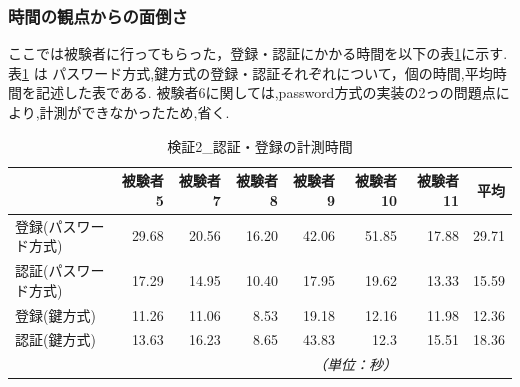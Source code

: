     \subsubsection{時間の観点からの面倒さ}
        ここでは被験者に行ってもらった，登録・認証にかかる時間を以下の表\ref{検証２ 認証・登録の計測時間}に示す.
        表\ref{検証２ 認証・登録の計測時間} は パスワード方式,鍵方式の登録・認証それぞれについて，個の時間,平均時間を記述した表である.
        被験者6に関しては,password方式の実装の2っの問題点により,計測ができなかったため,省く.
        \begin{table}[htb]
            \caption{検証2\_認証・登録の計測時間}
            \label{検証２ 認証・登録の計測時間}
            \begin{tabular}{|l|r|r|r|r|r|r|r|} \hline%
                                    & 被験者5 & 被験者7 & 被験者8 & 被験者9 & 被験者10 & 被験者11 & 平均 \\ \hline%
                登録(パスワード方式) & 29.68 & 20.56   & 16.20 & 42.06   & 51.85   & 17.88   & 29.71\\ \hline
                認証(パスワード方式) & 17.29 & 14.95   & 10.40 & 17.95   & 19.62   & 13.33   & 15.59\\ \hline
                登録(鍵方式)        & 11.26 & 11.06   & 8.53  & 19.18   & 12.16   & 11.98   & 12.36\\ \hline
                認証(鍵方式)        & 13.63 & 16.23   & 8.65  & 43.83   & 12.3    & 15.51   & 18.36\\ \hline
    
                \multicolumn{6}{r}{\small\it （単位：秒）}\\
            \end{tabular}
        \end{table}
    


